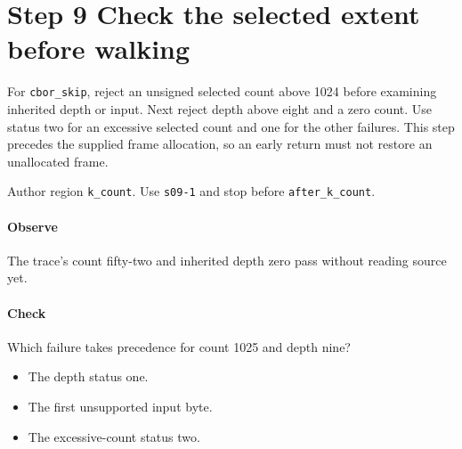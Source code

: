 \section{Step 9 Check the selected extent before walking}\label{cbor-s09}
For \texttt{cbor\_skip}, reject an unsigned selected count above 1024 before examining inherited depth or input. Next reject depth above eight and a zero count. Use status two for an excessive selected count and one for the other failures. This step precedes the supplied frame allocation, so an early return must not restore an unallocated frame.

Author region \texttt{k\_count}. Use \texttt{s09-1} and stop before \texttt{after\_k\_count}. 

\paragraph{Observe} The trace's count fifty-two and inherited depth zero pass without reading source yet.

\paragraph{Check} Which failure takes precedence for count 1025 and depth nine?
\begin{itemize}
\item[A.] The depth status one.
\item[B.] The first unsupported input byte.
\item[C.] The excessive-count status two.
\end{itemize}
